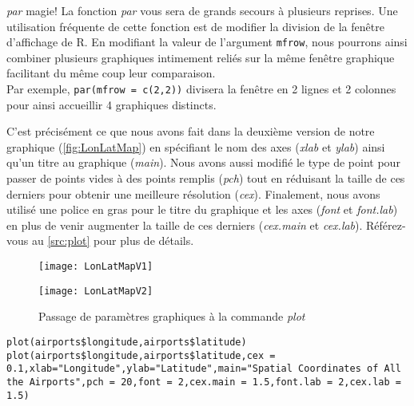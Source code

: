 \begin{moreInfo}{\emph{par} magie!}
	La fonction \emph{par} vous sera de grands secours à plusieurs reprises. Une utilisation fréquente de cette fonction est de modifier la division de la fenêtre d'affichage de R. En modifiant la valeur de l'argument \texttt{mfrow}, nous pourrons ainsi combiner plusieurs graphiques intimement reliés sur la même fenêtre graphique facilitant du même coup leur comparaison. \\
	Par exemple, \texttt{par(mfrow = c(2,2))} divisera la fenêtre en 2 lignes et 2 colonnes pour ainsi accueillir 4 graphiques distincts.
\end{moreInfo}

C'est précisément ce que nous avons fait dans la deuxième version de notre graphique (\autoref{fig:LonLatMap}) en spécifiant le nom des axes (\emph{xlab} et \emph{ylab}) ainsi qu'un titre au graphique (\emph{main}). Nous avons aussi modifié le type de point pour passer de points vides à des points remplis (\emph{pch}) tout en réduisant la taille de ces derniers pour obtenir une meilleure résolution (\emph{cex}). Finalement, nous avons utilisé une police en gras pour le titre du graphique et les axes (\emph{font} et \emph{font.lab}) en plus de venir augmenter la taille de ces derniers (\emph{cex.main} et \emph{cex.lab}). Référez-vous au \autoref{src:plot} pour plus de détails. \\
	
\begin{figure}
	\begin{minipage}{\textwidth}
		\centering
		\texttt{[image: LonLatMapV1]}
	\end{minipage}
	\newline
	\begin{minipage}{\textwidth}
		\centering
		\texttt{[image: LonLatMapV2]}
	\end{minipage}
	\caption{Passage de paramètres graphiques à la commande \emph{plot}}
\end{figure}
\label{fig:LonLatMap}

\begin{lstlisting}[caption = Utilisation de la commande \emph{plot},label=src:plot]
plot(airports$longitude,airports$latitude)
plot(airports$longitude,airports$latitude,cex = 0.1,xlab="Longitude",ylab="Latitude",main="Spatial Coordinates of All the Airports",pch = 20,font = 2,cex.main = 1.5,font.lab = 2,cex.lab = 1.5)
\end{lstlisting}

